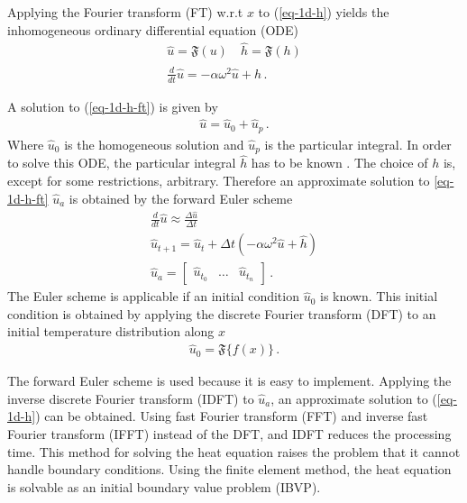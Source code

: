Applying the Fourier transform (FT) w.r.t \(x\) to (\ref{eq-1d-h}) yields the inhomogeneous ordinary differential equation (ODE)
\begin{gather}
\hat{u} = \mathfrak{F}(u) \quad \hat{h} = \mathfrak{F}(h) \\
\frac{d}{dt} \hat{u} = -\alpha\omega^{2}\hat{u} + \hat{h}\,. \label{eq-1d-h-ft}
\end{gather}

A solution to (\ref{eq-1d-h-ft}) is given by
\begin{gather}
\hat{u} = \hat{u}_{0} + \hat{u}_{p}\,.
\end{gather}
Where \(\hat{u}_{0}\) is the homogeneous solution and \(\hat{u}_{p}\) is the particular integral.
In order to solve this ODE, the particular integral \(\hat{h}\) has to be known \cite{Papula2015}.
The choice of \(h\) is, except for some restrictions, arbitrary.
Therefore an approximate solution to \ref{eq-1d-h-ft} \(\hat{u}_{a}\) is obtained by the forward Euler scheme
\begin{gather}
\frac{d}{dt} \hat{u} \approx \frac{\Delta \hat{u}}{\Delta t} \\
\hat{u}_{t+1} = \hat{u}_{t} + \Delta t (-\alpha\omega^{2}\hat{u} + \hat{h}) \label{eq-1d-h-es} \\
\hat{u}_{a} = \begin{bmatrix}
\hat{u}_{t_{0}} & \hdots & \hat{u}_{t_{n}}
\end{bmatrix}\,.
\end{gather}
The Euler scheme is applicable if an initial condition \(\hat{u}_{0}\) is known. 
This initial condition is obtained by applying the discrete Fourier transform (DFT) to an initial temperature distribution along \(x\) \cite{Gustafsson2011b}
\begin{gather}
\hat{u}_{0} = \mathfrak{F} \{f(x)\}\,.
\end{gather} 


The forward Euler scheme is used because it is easy to implement.
Applying the inverse discrete Fourier transform (IDFT) to \(\hat{u}_{a}\), an approximate solution to (\ref{eq-1d-h}) can be obtained.
Using fast Fourier transform (FFT) and inverse fast Fourier transform (IFFT)  instead of the DFT, and IDFT reduces the processing time.
This method for solving the heat equation raises the problem that it cannot handle boundary conditions. 
Using the finite element method, the heat equation is solvable as an initial boundary value problem (IBVP).
